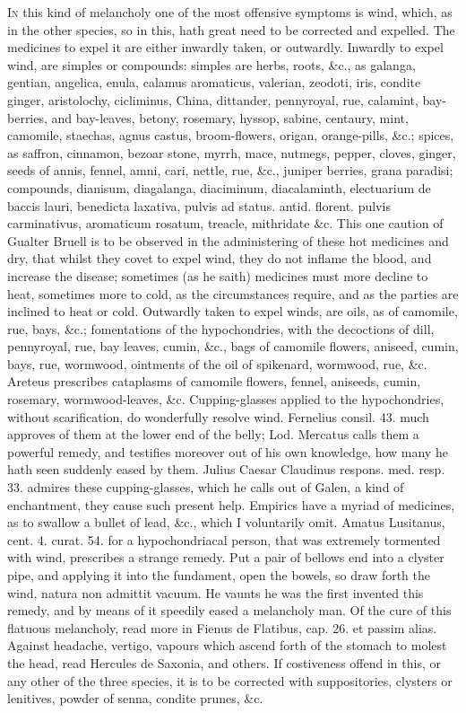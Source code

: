\lettrine{I}{n} this kind of melancholy one of the most offensive symptoms is wind,
which, as in the other species, so in this, hath great need to be
corrected and expelled.
The medicines to expel it are either inwardly taken, or outwardly.
Inwardly to expel wind, are simples or compounds: simples are herbs,
roots, \&c., as galanga, gentian, angelica, enula, calamus aromaticus,
valerian, zeodoti, iris, condite ginger, aristolochy, cicliminus,
China, dittander, pennyroyal, rue, calamint, bay-berries, and
bay-leaves, betony, rosemary, hyssop, sabine, centaury, mint, camomile,
staechas, agnus castus, broom-flowers, origan, orange-pills, \&c.;
spices, as saffron, cinnamon, bezoar stone, myrrh, mace, nutmegs,
pepper, cloves, ginger, seeds of annis, fennel, amni, cari, nettle,
rue, \&c., juniper berries, grana paradisi; compounds, dianisum,
diagalanga, diaciminum, diacalaminth, electuarium de baccis lauri,
benedicta laxativa, pulvis ad status. antid. florent. pulvis
carminativus, aromaticum rosatum, treacle, mithridate \&c. This one
caution of Gualter Bruell is to be observed in the administering
of these hot medicines and dry, that whilst they covet to expel wind,
they do not inflame the blood, and increase the disease; sometimes (as
he saith) medicines must more decline to heat, sometimes more to cold,
as the circumstances require, and as the parties are inclined to heat
or cold.
Outwardly taken to expel winds, are oils, as of camomile, rue, bays,
\&c.; fomentations of the hypochondries, with the decoctions of dill,
pennyroyal, rue, bay leaves, cumin, \&c., bags of camomile flowers,
aniseed, cumin, bays, rue, wormwood, ointments of the oil of spikenard,
wormwood, rue, \&c. Areteus prescribes cataplasms of camomile
flowers, fennel, aniseeds, cumin, rosemary, wormwood-leaves, \&c.
Cupping-glasses applied to the hypochondries, without
scarification, do wonderfully resolve wind. Fernelius consil. 43. much
approves of them at the lower end of the belly; Lod. Mercatus
calls them a powerful remedy, and testifies moreover out of his own
knowledge, how many he hath seen suddenly eased by them. Julius Caesar
Claudinus respons. med. resp. 33. admires these cupping-glasses, which
he calls out of Galen, a kind of enchantment, they cause such
present help.
Empirics have a myriad of medicines, as to swallow a bullet of lead,
\&c., which I voluntarily omit. Amatus Lusitanus, cent. 4. curat. 54.
for a hypochondriacal person, that was extremely tormented with wind,
prescribes a strange remedy. Put a pair of bellows end into a clyster
pipe, and applying it into the fundament, open the bowels, so draw
forth the wind, natura non admittit vacuum. He vaunts he was the first
invented this remedy, and by means of it speedily eased a melancholy
man. Of the cure of this flatuous melancholy, read more in Fienus de
Flatibus, cap. 26. et passim alias.
Against headache, vertigo, vapours which ascend forth of the stomach to
molest the head, read Hercules de Saxonia, and others.
If costiveness offend in this, or any other of the three species, it is
to be corrected with suppositories, clysters or lenitives, powder of
senna, condite prunes, \&c. 



